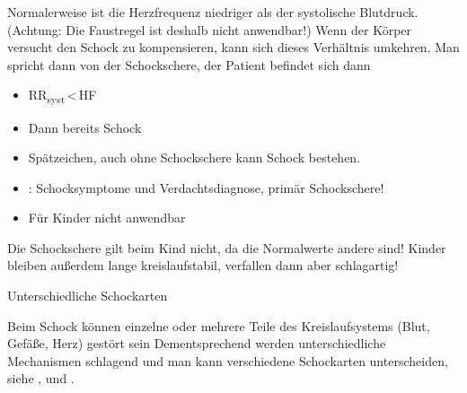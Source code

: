 {
\label{topic:schockschere}
Normalerweise ist die Herzfrequenz niedriger als der
systolische Blutdruck. (Achtung:  Die Faustregel ist deshalb nicht
anwendbar!) Wenn der Körper versucht den Schock zu
kompensieren, kann sich dieses Verhältnis umkehren. Man
spricht dann von der Schockschere, der Patient befindet sich
dann  




}{
\begin{itemize}
  \item RR\textsubscript{syst}\,{\textless}\,HF
  \item Dann bereits  Schock
  \item Spätzeichen, auch ohne Schockschere kann Schock bestehen.
  \item[\Ca{!}] : Schocksymptome und
  Verdachtsdiagnose,  primär Schockschere!
  \item Für Kinder nicht anwendbar
\end{itemize}
}{}{}{}


{Die Schockschere gilt beim Kind nicht, da die
Normalwerte andere sind! Kinder bleiben außerdem lange
kreislaufstabil, verfallen dann aber schlagartig!

}{}
{}
{}
{}
{}


{Unterschiedliche Schockarten}
{
\label{topic:schock-arten}%
Beim Schock können einzelne oder mehrere Teile des
Kreislaufsystems  (Blut, Gefäße, Herz) gestört sein
Dementsprechend werden unterschiedliche Mechanismen
schlagend und man kann verschiedene Schockarten
unterscheiden, siehe
, und
.

}
{}
{}
{}
{}


